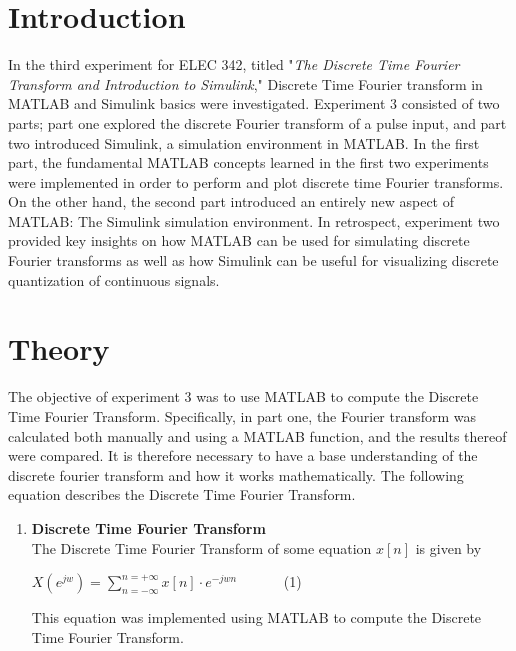 \documentclass{article}
\begin{document}
\section{Introduction}

In the third experiment for ELEC 342, titled "\textit{The Discrete Time Fourier Transform and Introduction to Simulink}," Discrete Time Fourier transform in MATLAB and Simulink basics were investigated. Experiment 3 consisted of two parts; part one explored the discrete Fourier transform of a pulse input, and part two introduced Simulink, a simulation environment in MATLAB. In the first part, the fundamental MATLAB concepts learned in the first two experiments were implemented in order to perform and plot discrete time Fourier transforms. On the other hand, the second part introduced an entirely new aspect of MATLAB: The Simulink simulation environment. In retrospect, experiment two provided key insights on how MATLAB can be used for simulating discrete Fourier transforms as well as how Simulink can be useful for visualizing discrete quantization of continuous signals.
 

\section{Theory}

The objective of experiment 3 was to use MATLAB to compute the Discrete Time Fourier Transform. Specifically, in part one, the Fourier transform was calculated both manually and using a MATLAB function, and the results thereof were compared. It is therefore necessary to have a base understanding of the discrete fourier transform and how it works mathematically. The following equation describes the Discrete Time Fourier Transform.

\begin{enumerate}
    \item \textbf{Discrete Time Fourier Transform} \\
    The Discrete Time Fourier Transform of some equation $x[n]$ is given by
    \begin{center}
       $X(e^{jw}) = \sum\limits_{n=-\infty}^{n=+\infty} x[n] \cdot e^{-jwn}$ \ \ \ \ \ \  (1)
    \end{center}
    This equation was implemented using MATLAB to compute the Discrete Time Fourier Transform.
\end{enumerate}
\end{document}
